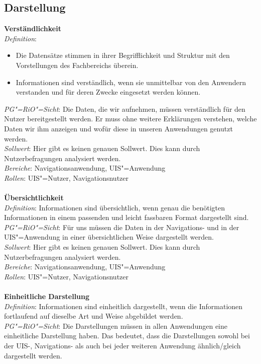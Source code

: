 \subsection{Darstellung}
\textbf{Verständlichkeit}\\
\textit{Definition}:
\begin{itemize}
\item	Die Datensätze stimmen in ihrer Begrifflichkeit und Struktur mit den Vorstellungen des Fachbereichs überein. 
\item	Informationen sind verständlich, wenn sie unmittelbar von den Anwendern verstanden und für deren Zwecke eingesetzt werden können.
\end{itemize}
\textit{PG"=RiO"=Sicht}: Die Daten, die wir aufnehmen, müssen verständlich für den Nutzer bereitgestellt werden. Er muss ohne weitere Erklärungen verstehen, welche Daten wir ihm anzeigen und wofür diese in unseren Anwendungen genutzt werden.  \\
\textit{Sollwert}: Hier gibt es keinen genauen Sollwert. Dies kann durch Nutzerbefragungen analysiert werden. \\
\textit{Bereiche}: Navigationsanwendung, UIS"=Anwendung \\
\textit{Rollen}: UIS"=Nutzer, Navigationsnutzer \\
\\
\textbf{Übersichtlichkeit}\\
\textit{Definition}: Informationen sind übersichtlich, wenn genau die benötigten Informationen in einem passenden und leicht fassbaren Format dargestellt sind. \\
\textit{PG"=RiO"=Sicht}: Für uns müssen die Daten in der Navigations- und in der UIS"=Anwendung in einer übersichtlichen Weise dargestellt werden. \\
\textit{Sollwert}: Hier gibt es keinen genauen Sollwert. Dies kann durch Nutzerbefragungen analysiert werden. \\
\textit{Bereiche}: Navigationsanwendung, UIS"=Anwendung \\
\textit{Rollen}: UIS"=Nutzer, Navigationsnutzer \\
\\
\textbf{Einheitliche Darstellung} \\
\textit{Definition}: Informationen sind einheitlich dargestellt, wenn die Informationen fortlaufend auf dieselbe Art und Weise abgebildet werden. \\
\textit{PG"=RiO"=Sicht}: Die Darstellungen müssen in allen Anwendungen eine einheitliche Darstellung haben. Das bedeutet, dass die Darstellungen sowohl bei der UIS-, Navigations- als auch bei jeder weiteren Anwendung ähnlich/gleich dargestellt werden. \\
